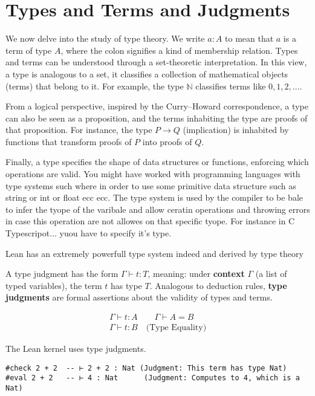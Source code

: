 \section{Types and Terms and Judgments}
We now delve into the study of type theory.
We write $a : A$ to mean that $a$ is a term of type $A$, where the
colon signifies a kind of membership relation.
Types and terms can be understood through a set-theoretic interpretation. In this view, a type is analogous to
a set, it classifies a collection of mathematical objects (terms) that belong to it. For example, the
type $\mathbb{N}$ classifies terms like $0, 1, 2, \ldots$.

From a logical perspective, inspired by the Curry–Howard correspondence, a type can also be seen as a proposition,
and the terms inhabiting the type are proofs of that proposition. For instance, the type $P \to Q$ (implication)
is inhabited by functions that transform proofs of $P$ into proofs of $Q$.

Finally, a type specifies the shape of data structures or functions, enforcing which operations are valid.
You might have worked with programming languages with type systems such where in order to use some
primitive data structure such as string or int or float ecc ecc.
The type system is used by the compiler to be bale to infer the tyope of the varibale and allow ceratin operations
and throwing errors in case this operation are not allowes on that specific tyope.
For instance in C Typescripot...
yuou have to specify it's type.


Lean has an extremely powerfull type system indeed and derived by type theory



A type judgment has the form $\Gamma \vdash t : T$,
meaning: under \textbf{context} $\Gamma$
(a list of typed variables), the term $t$ has type $T$.
Analogous to deduction rules, \textbf{type judgments} are formal assertions about the validity of types and terms.
\begin{example}
    \[
        \begin{array}{c}
            \Gamma \vdash t : A \qquad \Gamma \vdash A = B \\ [1ex]
            \hline
            \Gamma \vdash t : B \quad \text{(Type Equality)}
        \end{array}
    \]
\end{example}
\begin{example}
    The Lean kernel uses type judgments.
    \begin{lstlisting}[language=Lean]
#check 2 + 2  -- ⊢ 2 + 2 : Nat (Judgment: This term has type Nat)
#eval 2 + 2   -- ⊢ 4 : Nat      (Judgment: Computes to 4, which is a Nat)

\end{lstlisting}
\end{example}


